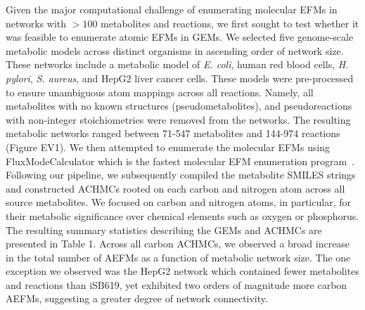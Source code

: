 \documentclass[12pt]{article}
\begin{document}
Given the major computational challenge of enumerating molecular EFMs in
networks with $>100$ metabolites and reactions, we first sought to test
whether it was feasible to enumerate atomic EFMs in GEMs. We selected five
genome-scale metabolic models across distinct organisms in ascending order
of network size. These networks include a metabolic model of \textit{E.
coli}, human red blood cells, \textit{H. pylori}, \textit{S. aureus}, and
HepG2 liver cancer cells. These models were pre-processed to ensure
unambiguous atom mappings across all reactions. Namely, all metabolites
with no known structures (pseudometabolites), and pseudoreactions with
non-integer stoichiometries were removed from the networks. The resulting
metabolic networks ranged between 71-547 metabolites and 144-974 reactions
(Figure EV1). We then attempted to enumerate the molecular EFMs using
FluxModeCalculator which is the fastest molecular EFM enumeration
program~\citep{vanKlinkenJanBert2016Faet}. Following our pipeline, we
subsequently compiled the metabolite SMILES strings and constructed ACHMCs
rooted on each carbon and nitrogen atom across all source metabolites. We
focused on carbon and nitrogen atoms, in particular, for their metabolic
significance over chemical elements such as oxygen or phosphorus. The
resulting summary statistics describing the GEMs and ACHMCs are presented
in Table 1. Across all carbon ACHMCs, we observed a broad increase in the
total number of AEFMs as a function of metabolic network size. The one
exception we observed was the HepG2 network which contained fewer
metabolites and reactions than iSB619, yet exhibited two orders of
magnitude more carbon AEFMs, suggesting a greater degree of network
connectivity. 
\end{document}
